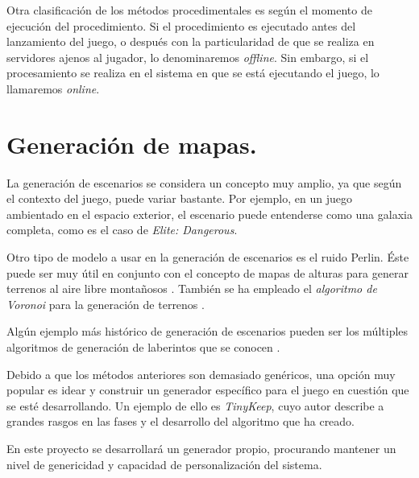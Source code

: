 Otra clasificación de los métodos procedimentales es según el momento de ejecución del procedimiento. Si el procedimiento es ejecutado antes del lanzamiento del juego, o después con la particularidad de que se realiza en servidores ajenos al jugador, lo denominaremos \emph{offline}. Sin embargo, si el procesamiento se realiza en el sistema en que se está ejecutando el juego, lo llamaremos \emph{online}.

\section{Generación de mapas.}

La generación de escenarios se considera un concepto muy amplio, ya que según el contexto del juego, puede variar bastante. Por ejemplo, en un juego ambientado en el espacio exterior, el escenario puede entenderse como una galaxia completa, como es el caso de \emph{Elite: Dangerous}.

Otro tipo de modelo a usar en la generación de escenarios es el ruido Perlin. Éste puede ser muy útil en conjunto con el concepto de mapas de alturas para generar terrenos al aire libre montañosos \cite{libnoise}. También se ha empleado el \emph{algoritmo de Voronoi} para la generación de terrenos \cite{amitvoronoi}.

Algún ejemplo más histórico de generación de escenarios pueden ser los múltiples algoritmos de generación de laberintos que se conocen \cite{labygen}.

Debido a que los métodos anteriores son demasiado genéricos, una opción muy popular es idear y construir un generador específico para el juego en cuestión que se esté desarrollando. Un ejemplo de ello es \emph{TinyKeep}, cuyo autor describe a grandes rasgos en \cite{tinykeep} las fases y el desarrollo del algoritmo que ha creado.

En este proyecto se desarrollará un generador propio, procurando mantener un nivel de genericidad y capacidad de personalización del sistema.



